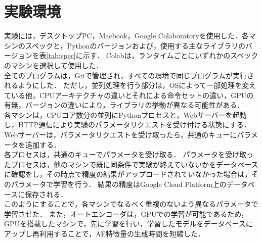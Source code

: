 \section{実験環境}
実験には，デスクトップPC，Macbook，Google Colaboratoryを使用した．各マシンのスペックと，Pythonのバージョンおよび，使用する主なライブラリのバージョンを表\ref{tab:spec}に示す．
Colabは，ランタイムごとにいずれかのスペックのマシンを選択して使用した．\\
全てのプログラムは，Gitで管理され，すべての環境で同じプログラムが実行されるようにした．
ただし，並列処理を行う部分は，OSによって一部処理を変えている他，CPUアーキテクチャの違いとそれによる命令セットの違い，GPUの有無，バージョンの違いにより，ライブラリの挙動が異なる可能性がある．\\

各マシンは，CPUコア数分の並列にPythonプロセスと，Webサーバーを起動し，HTTP通信により実験のパラメータリクエストを受け付ける状態にする．\\
Webサーバーは，パラメータリクエストを受け取ったら，共通のキューにパラメータを追加する．\\
各プロセスは，共通のキューでパラメータを受け取る．
パラメータを受け取ったプロセスは，他のマシンで既に同条件で実験が終えていないかをデータベースに確認をし，その時点で精度の結果がアップロードされていなかった場合は，そのパラメータで学習を行う．
結果の精度はGoogle Cloud Platform上のデータベースに保存される．\\

このようにすることで，各マシンでなるべく重複のないよう異なるパラメータで学習させた．
また，オートエンコーダは，GPUでの学習が可能であるため，GPUを搭載したマシンで，先に学習を行い，学習したモデルをデータべースにアップし再利用することで，AE特徴量の生成時間を短縮した．\\


